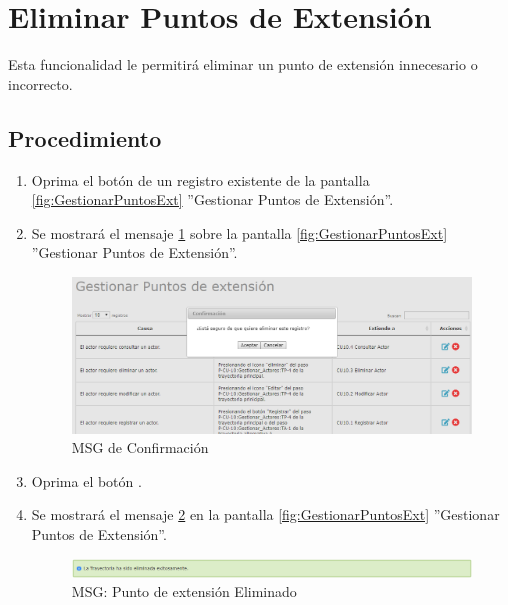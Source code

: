 \hypertarget{cv:eliminarPExt}{\section{Eliminar Puntos de Extensión}} \label{sec:eliminarPExt}

	Esta funcionalidad le permitirá eliminar un punto de extensión innecesario o incorrecto. 

		\subsection{Procedimiento}

			\begin{enumerate}
	
			\item Oprima el botón \IUBotonEliminar{} de un registro existente de la pantalla \ref{fig:GestionarPuntosExt} ''Gestionar Puntos de Extensión''.
	
			\item Se mostrará el mensaje \ref{fig:confirmaEliminaPExt} sobre la pantalla \ref{fig:GestionarPuntosExt} ''Gestionar Puntos de Extensión''.
			
			\begin{figure}[htbp!]
				\begin{center}
					\includegraphics[scale=0.5]{roles/lider/puntosExtension/pantallas/IU6-1-4-3MSG10}
					\caption{MSG de Confirmación}
					\label{fig:confirmaEliminaPExt}
				\end{center}
			\end{figure}
						
			\item Oprima el botón \IUAceptar.
			
			\item Se mostrará el mensaje \ref{fig:PExtEliminado} en la pantalla \ref{fig:GestionarPuntosExt} ''Gestionar Puntos de Extensión''.
			
			\begin{figure}[htbp!]
				\begin{center}
					\includegraphics[scale=0.5]{roles/lider/puntosExtension/pantallas/IU6-1-4-3MSG1}
					\caption{MSG: Punto de extensión Eliminado}
					\label{fig:PExtEliminado}
				\end{center}
			\end{figure}
			\end{enumerate}